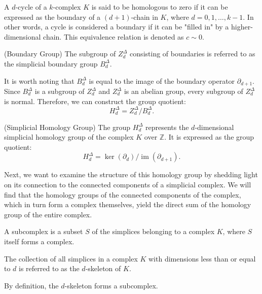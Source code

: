 A $d$-cycle of a $k$-complex $K$ is said to be homologous to zero if it can be expressed
as the boundary of a $(d+1)$-chain in $K$, where $d = 0, 1, \ldots, k-1$. In other
words, a cycle is considered a boundary if it can be "filled in" by a higher-dimensional
chain. This equivalence relation is denoted as $c \sim 0$.

\begin{definition}
	{(Boundary Group) \cite[\S 2.3]{zomorodian2004computing}} The subgroup of $Z^{\Delta}
	_{d}$ consisting of boundaries is referred to as the simplicial boundary group
	$B^{\Delta}_{d}$.
\end{definition}

It is worth noting that $B^{\Delta}_{d}$ is equal to the image of the boundary
operator $\partial_{d+1}$. Since $B^{\Delta}_{d}$ is a subgroup of $Z^{\Delta}_{d}$
and $Z^{\Delta}_{d}$ is an abelian group, every subgroup of $Z^{\Delta}_{d}$ is
normal. Therefore, we can construct the group quotient:
\[
	H^{\Delta}_{d} = Z^{\Delta}_{d} / B^{\Delta}_{d}.
\]

\begin{definition}
	{(Simplicial Homology Group) \cite[\S 2.1]{hatcher2005algebraic}} The group $H^{\Delta}
	_{d}$ represents the $d$-dimensional simplicial homology group of the complex $K$
	over $\mathbb{Z}$. It is expressed as the group quotient:
	\[
		H^{\Delta}_{d} = \ker(\partial_{d}) / \operatorname{im}(\partial_{d+1}).
	\]
\end{definition}

Next, we want to examine the structure of this homology group by shedding light
on its connection to the connected components of a simplicial complex. We will find
that the homology groups of the connected components of the complex, which in
turn form a complex themselves, yield the direct sum of the homology group of the
entire complex.

\begin{definition}
	A subcomplex is a subset $S$ of the simplices belonging to a complex $K$,
	where $S$ itself forms a complex.
\end{definition}

\begin{definition}
	The collection of all simplices in a complex $K$ with dimensions less than or equal
	to $d$ is referred to as the $d$-skeleton of $K$.
\end{definition}

By definition, the $d$-skeleton forms a subcomplex.

